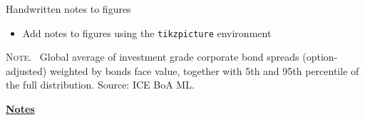 \documentclass[10pt]{beamer}
\begin{document}
\begin{frame}[t]
    {Handwritten notes to figures}
    \begin{itemize}
        \item Add notes to figures using the \texttt{tikzpicture} environment
    \end{itemize}
    \begin{center}
        \begin{minipage}[b]{.6\textwidth}
            \tiny{{\scshape Note}. \ Global average of investment grade corporate bond spreads (option-adjusted) weighted by bonds face value, together with 5th and 95th percentile of the full distribution. Source: ICE BoA ML.} 
        \end{minipage}
    \end{center}
\end{frame}	
\begin{flushleft}
    \underline{\textbf{Notes}}\setlength{\parskip}{.15cm}\notesize\newline\par
\end{flushleft}
\end{document}
